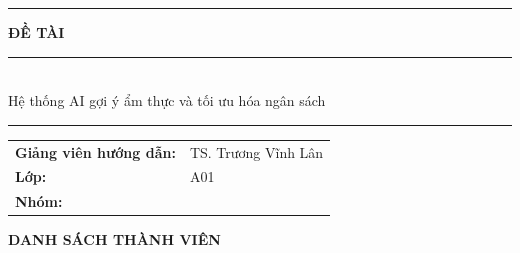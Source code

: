 \documentclass[a4paper]{article}
\begin{document}
\begin{titlepage}
\begin{center}
\begin{minipage}{0.9\textwidth}
    \justifying\centering
   \textcolor{bku_blue_bold}{ \rule{6.5cm}{0.4pt}} \textcolor{bku_blue_bold}{\textbf{\fontsize{13}{20}\selectfont ĐỀ TÀI } }\textcolor{bku_blue_bold}{ \rule{6.5cm}{0.4pt}}\\
    \vspace{0.3cm}
   \textcolor{bku_blue}{ \onehalfspacing \fontsize{13}{20}\selectfont
Hệ thống AI gợi ý ẩm thực và tối ưu hóa ngân sách \\
    }
    \vspace{0.5cm}
    \textcolor{bku_blue_bold}{ \rule{15cm}{0.4pt}}
\end{minipage}
\end{center}

\begin{center}
\begin{table}[h]
\centering
\renewcommand{\arraystretch}{1.5} 
    \begin{tabular}{p{5cm} p{6cm}} 
    \textcolor{bku_blue_bold}{
    \fontsize{13}{20}\selectfont \textbf{Giảng viên hướng dẫn:}} & \textcolor{bku_blue_bold}{\fontsize{13}{20}\selectfont }TS. Trương Vĩnh Lân\\ 
\textcolor{bku_blue_bold}{\fontsize{13}{20}\selectfont \textbf{Lớp:}} & \textcolor{bku_blue_bold}{\fontsize{13}{20}\selectfont }A01 \\
        \textcolor{bku_blue_bold}{\fontsize{13}{20}\selectfont \textbf{Nhóm:}} & \fontsize{13}{20}\selectfont 08\\
    \end{tabular}
\end{table}
\end{center}

\end{titlepage}
\newpage

\begin{center}
    { \fontsize{20}{20}\selectfont\textbf{ DANH SÁCH THÀNH VIÊN}}\\
\end{center}
\end{document}
